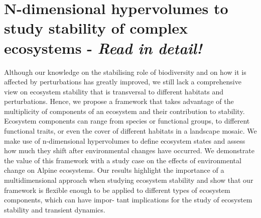 \section*{N-dimensional hypervolumes to study stability of complex ecosystems \citep{Barros2016} - \textit{Read in detail!}}

Although our knowledge on the stabilising role of biodiversity and on how it is affected by perturbations has greatly improved, we still lack a comprehensive view on ecosystem stability that is transversal to different habitats and perturbations. Hence, we propose a framework that takes advantage of the multiplicity of components of an ecosystem and their contribution to stability. Ecosystem components can range from species or functional groups, to different functional traits, or even the cover of different habitats in a landscape mosaic. We make use of n-dimensional hypervolumes to define ecosystem states and assess how much they shift after environmental changes have occurred. We demonstrate the value of this framework with a study case on the effects of environmental change on Alpine ecosystems. Our results highlight the importance of a multidimensional approach when studying ecosystem stability and show that our framework is flexible enough to be applied to different types of ecosystem components, which can have impor- tant implications for the study of ecosystem stability and transient dynamics.


